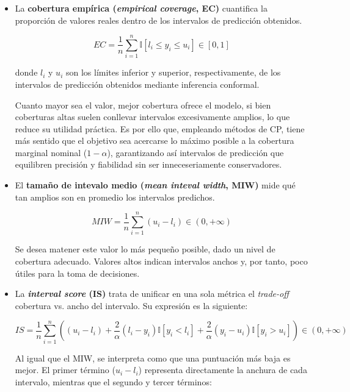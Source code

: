 \begin{itemize}
    \item La \textbf{cobertura empírica (\textit{empirical coverage}, EC)} cuantifica la proporción de valores
    reales dentro de los intervalos de predicción obtenidos. 
    
    $$
    EC = \frac{1}{n} 
        \sum_{i=1}^n{ \mathbb{I} \left[ l_i \le y_i \le u_i \right] } 
            \in \left[0, 1\right]
    $$

    donde $l_i$ y $u_i$ son los límites inferior y superior, respectivamente, de los intervalos de predicción 
    obtenidos mediante inferencia conformal.

    Cuanto mayor sea el valor, mejor cobertura ofrece el modelo, si bien coberturas altas suelen conllevar 
    intervalos excesivamente amplios, lo que reduce su utilidad práctica. Es por ello que, empleando métodos
    de CP, tiene más sentido que el objetivo sea acercarse lo máximo posible a la cobertura marginal 
    nominal ($1-\alpha$), garantizando así intervalos de predicción que equilibren precisión y fiabilidad sin
    ser inneceseriamente conservadores. 
    
    \item El \textbf{tamaño de intevalo medio (\textit{mean inteval width}, MIW)} mide qué tan amplios son en 
    promedio los intervalos predichos.
    
    $$
    MIW = \frac{1}{n} \sum_{i=1}^n{ \left( u_i - l_i \right) } \in (0, +\infty)
    $$
    
    Se desea matener este valor lo más pequeño posible, dado un nivel de cobertura adecuado. Valores altos
    indican intervalos anchos y, por tanto, poco útiles para la toma de decisiones. 


    \item La \textbf{\textit{interval score} (IS)} \cite{gneiting2007} trata de unificar en una sola métrica
    el \textit{trade-off} cobertura vs. ancho del intervalo. Su expresión es la siguiente:

    $$
    IS = \frac{1}{n} \sum_{i=1}^n{
            \left(         
                (u_i-l_i) 
                + \frac{2}{\alpha} \left( l_i-y_i \right) \mathbb{I}\left[ y_i<l_i \right] 
                + \frac{2}{\alpha}  \left( y_i-u_i \right) \mathbb{I}\left[ y_i>u_i \right]
            \right)
        } 
        \in (0, +\infty)
    $$

    Al igual que el MIW, se interpreta como que una puntuación más baja es mejor. 
    El primer término ($u_i-l_i$) representa directamente la anchura de cada intervalo, mientras que 
    el segundo y tercer términos:


\end{itemize}

